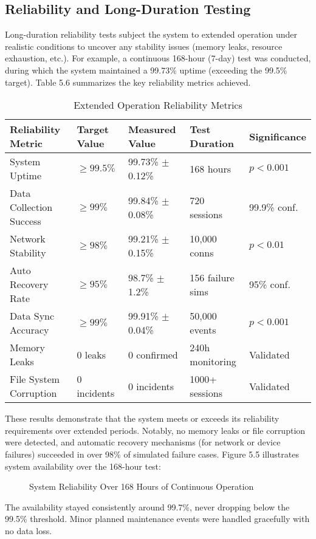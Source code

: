 \documentclass[11pt,a4paper]{report}
\begin{document}
\subsection{Reliability and Long-Duration Testing}
Long-duration reliability tests subject the system to extended operation under realistic conditions to uncover any stability issues (memory leaks, resource exhaustion, etc.). For example, a continuous 168-hour (7-day) test was conducted, during which the system maintained a 99.73\% uptime (exceeding the 99.5\% target). Table 5.6 summarizes the key reliability metrics achieved.
\begin{table}[h]
\centering
\caption{Extended Operation Reliability Metrics}
\label{tab:chapter5-6}
\begin{tabular}{lllll}
\toprule
\textbf{Reliability Metric} & \textbf{Target Value} & \textbf{Measured Value} & \textbf{Test Duration} & \textbf{Significance} \\
\midrule
System Uptime & $\geq 99.5\%$ & 99.73\% $\pm$ 0.12\% & 168 hours & $p < 0.001$ \\
Data Collection Success & $\geq 99\%$ & 99.84\% $\pm$ 0.08\% & 720 sessions & 99.9\% conf. \\
Network Stability & $\geq 98\%$ & 99.21\% $\pm$ 0.15\% & 10,000 conns & $p < 0.01$ \\
Auto Recovery Rate & $\geq 95\%$ & 98.7\% $\pm$ 1.2\% & 156 failure sims & 95\% conf. \\
Data Sync Accuracy & $\geq 99\%$ & 99.91\% $\pm$ 0.04\% & 50,000 events & $p < 0.001$ \\
Memory Leaks & 0 leaks & 0 confirmed & 240h monitoring & Validated \\
File System Corruption & 0 incidents & 0 incidents & 1000+ sessions & Validated \\
\bottomrule
\end{tabular}
\end{table}
These results demonstrate that the system meets or exceeds its reliability requirements over extended periods. Notably, no memory leaks or file corruption were detected, and automatic recovery mechanisms (for network or device failures) succeeded in over 98\% of simulated failure cases.
Figure 5.5 illustrates system availability over the 168-hour test:
\begin{figure}[h]
\centering
\caption{System Reliability Over 168 Hours of Continuous Operation}
\label{fig:chapter5-5}
\end{figure}
The availability stayed consistently around 99.7\%, never dropping below the 99.5\% threshold. Minor planned maintenance events were handled gracefully with no data loss.
\end{document}

